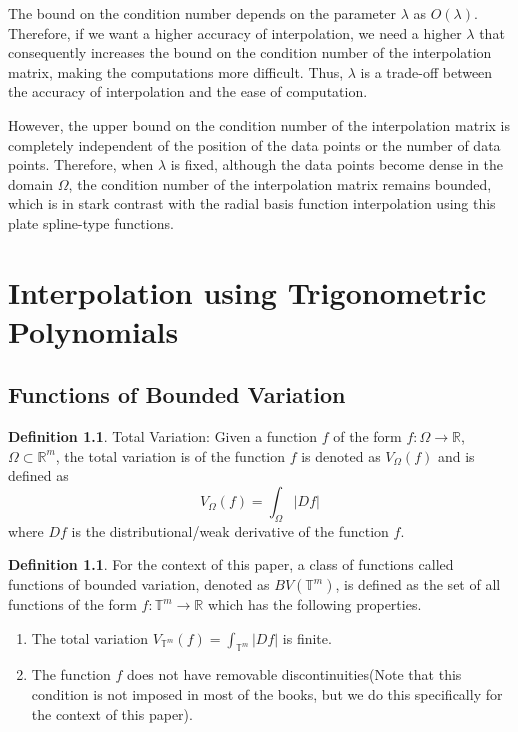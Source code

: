 \documentclass[multixcb]{amstext-l}
\theoremstyle{plain}
\theoremstyle{definition}
\theoremstyle{definition}
\newtheorem{definition}[theorem]{Definition}
\theoremstyle{remark}
\numberwithin{equation}{chapter}
\begin{document}
The bound on the condition number depends on the parameter $\lambda$ as $O(\lambda)$. Therefore, if we want a higher accuracy of interpolation, we need a higher $\lambda$ that consequently increases the bound on the condition number of the interpolation matrix, making the computations more difficult. Thus, $\lambda$ is a trade-off between the accuracy of interpolation and the ease of computation.

However, the upper bound on the condition number of the interpolation matrix is completely independent of the position of the data points or the number of data points. Therefore, when $\lambda$ is fixed, although the data points become dense in the domain $\Omega$, the condition number of the interpolation matrix remains bounded, which is in stark contrast with the radial basis function interpolation using this plate spline-type functions.

\chapter{Interpolation using Trigonometric Polynomials}\label{chap_3}


\section{Functions of Bounded Variation}

\begin{definition}
Total Variation: Given a function $f$ of the form $f:\Omega\to\mathbb{R}$, $\Omega\subset\mathbb{R}^m$, the total variation is of the function $f$ is denoted as $V_{\Omega}(f)$ and is defined as \begin{equation}
    V_{\Omega}(f) = \int_{\Omega}|Df|
\end{equation} where $Df$ is the distributional/weak derivative of the function $f$.
\end{definition}

\begin{definition}
For the context of this paper, a class of functions called functions of bounded variation, denoted as $BV(\mathbb{T}^m)$, is defined as the set of all functions of the form $f:\mathbb{T}^m\to\mathbb{R}$ which has the following properties. 
\begin{enumerate}
    \item The total variation $V_{\mathbb{T}^m}(f) = \int_{\mathbb{T}^m}|Df|$ is finite.
    \item The function $f$ does not have removable discontinuities(Note that this condition is not imposed in most of the books, but we do this specifically for the context of this paper).
\end{enumerate}

\end{definition}
\end{document}
